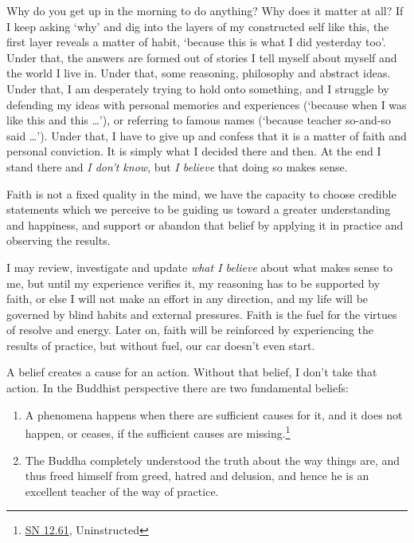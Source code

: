 Why do you get up in the morning to do anything? Why does it matter at
all? If I keep asking `why' and dig into the layers of my constructed
self like this, the first layer reveals a matter of habit, `because this
is what I did yesterday too'. Under that, the answers are formed out of
stories I tell myself about myself and the world I live in. Under that,
some reasoning, philosophy and abstract ideas. Under that, I am
desperately trying to hold onto something, and I struggle by defending
my ideas with personal memories and experiences (`because when I was
like this and this \ldots{}'), or referring to famous names (`because
teacher so-and-so said \ldots{}'). Under that, I have to give up and
confess that it is a matter of faith and personal conviction. It is
simply what I decided there and then. At the end I stand there and
\emph{I don't know}, but \emph{I believe} that doing so makes sense.

Faith is not a fixed quality in the mind, we have the capacity to choose
credible statements which we perceive to be guiding us toward a greater
understanding and happiness, and support or abandon that belief by
applying it in practice and observing the results.

I may review, investigate and update \emph{what I believe} about what
makes sense to me, but until my experience verifies it, my reasoning has
to be supported by faith, or else I will not make an effort in any
direction, and my life will be governed by blind habits and external
pressures. Faith is the fuel for the virtues of resolve and energy.
Later on, faith will be reinforced by experiencing the results of
practice, but without fuel, our car doesn't even start.


A belief creates a cause for an action. Without that belief, I don't
take that action. In the Buddhist perspective there are two fundamental
beliefs:

\begin{enumerate}
\tightlist
\item
  A phenomena happens when there are sufficient causes for it, and it
  does not happen, or ceases, if the sufficient causes are
  missing.\footnote{\href{https://www.dhammatalks.org/suttas/SN/SN12_61.html}{SN
    12.61}, Uninstructed}
\item
  The Buddha completely understood the truth about the way things are,
  and thus freed himself from greed, hatred and delusion, and hence he
  is an excellent teacher of the way of practice.
\end{enumerate}

